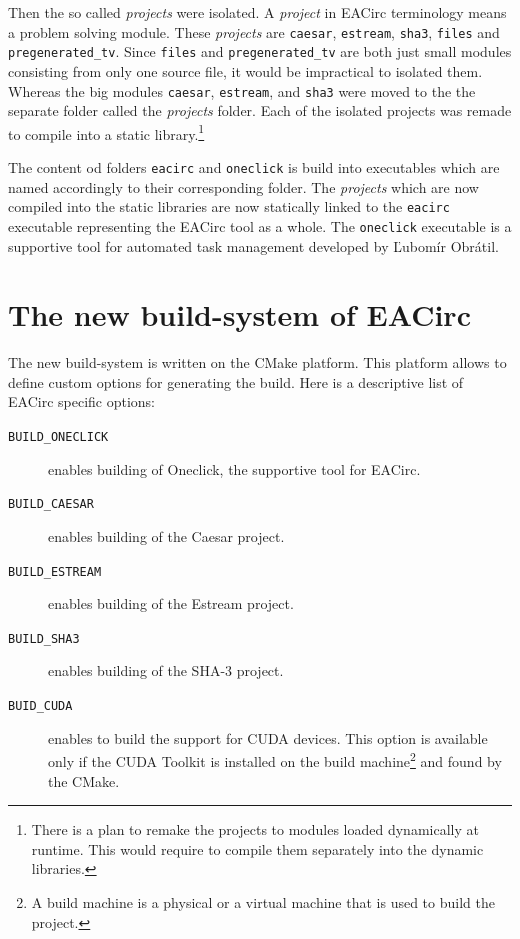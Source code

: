 \documentclass[12pt,oneside]{fithesis2}
\begin{document}
Then the so called \emph{projects} were isolated. A \emph{project} in EACirc terminology means a problem solving module. These \emph{projects} are \texttt{caesar}, \texttt{estream}, \texttt{sha3}, \texttt{files} and \texttt{pregenerated\_tv}. Since \texttt{files} and \texttt{pregenerated\_tv} are both just small modules consisting from only one source file, it would be impractical to isolated them. Whereas the big modules \texttt{caesar}, \texttt{estream}, and \texttt{sha3} were moved to the the separate folder called the \emph{projects} folder. Each of the isolated projects was remade to compile into a static library.\footnote{There is a plan to remake the projects to modules loaded dynamically at runtime. This would require to compile them separately into the dynamic libraries.}

The content od folders \texttt{eacirc} and \texttt{oneclick} is build into executables which are named accordingly to their corresponding folder. The \emph{projects} which are now compiled into the static libraries are now statically linked to the \texttt{eacirc} executable representing the EACirc tool as a whole. The \texttt{oneclick} executable is a supportive tool for automated task management developed by Ľubomír Obrátil. \cite{oneclick}

\section{The new build-system of EACirc}

The new build-system is written on the CMake platform. This platform allows to define custom options for generating the build. Here is a descriptive list of EACirc specific options:

\begin{description}
	\item[\texttt{BUILD\_ONECLICK}] enables building of Oneclick, the supportive tool for EACirc.
	\item[\texttt{BUILD\_CAESAR}] enables building of the Caesar project.
	\item[\texttt{BUILD\_ESTREAM}] enables building of the Estream project.
	\item[\texttt{BUILD\_SHA3}] enables building of the SHA-3 project.
	\item[\texttt{BUID\_CUDA}] enables to build the support for CUDA devices. This option is available only if the CUDA Toolkit \cite{cuda_toolkit} is installed on the build machine\footnote{A build machine is a physical or a virtual machine that is used to build the project.} and found by the CMake.
\end{description}
\end{document}
